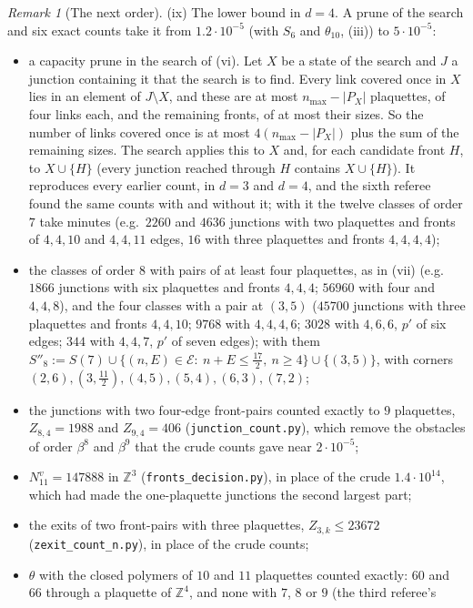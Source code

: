 \documentclass[11pt,a4paper]{article}
\theoremstyle{definition}
\theoremstyle{remark}
\newtheorem{remark}[theorem]{Remark}
\newcommand{\Z}{\mathbb{Z}}
\begin{document}
\begin{remark}[The next order]
(ix) The lower bound in $d=4$. A prune of the search and six exact counts take it from $1.2\cdot10^{-5}$ (with $S_6$ and $\theta_{10}$, (iii)) to $5\cdot10^{-5}$:
\begin{itemize}
\item a capacity prune in the search of (vi). Let $X$ be a state of the search and $J$ a junction containing it that the search is to find. Every link covered once in $X$ lies in an
element of $J\setminus X$, and these are at most $n_{\max}-|P_X|$ plaquettes, of four links each, and the remaining fronts, of at most their sizes. So the number of links covered once is at
most $4(n_{\max}-|P_X|)$ plus the sum of the remaining sizes. The search applies this to $X$ and, for each candidate front $H$, to $X\cup\{H\}$ (every junction reached through $H$
contains $X\cup\{H\}$). It reproduces every earlier count, in $d=3$ and $d=4$, and the sixth referee found the same counts with and without it; with it the twelve classes of order $7$ take minutes (e.g.\ $2260$ and $4636$ junctions with two
plaquettes and fronts of $4,4,10$ and $4,4,11$ edges, $16$ with three plaquettes and fronts $4,4,4,4$);
\item the classes of order $8$ with pairs of at least four plaquettes, as in (vii) (e.g.\ $1866$ junctions with six plaquettes and fronts $4,4,4$; $56960$ with four and
$4,4,8$), and the four classes with a pair at $(3,5)$ ($45700$ junctions with three plaquettes and fronts $4,4,10$; $9768$ with $4,4,4,6$; $3028$ with $4,6,6$, $p'$ of six edges;
$344$ with $4,4,7$, $p'$ of seven edges); with them $S''_8:=S(7)\cup\{(n,E)\in\mathcal E:\ n+E\le\frac{17}2,\ n\ge4\}\cup\{(3,5)\}$, with corners $(2,6),(3,\frac{11}2),(4,5),(5,4),(6,3),(7,2)$;
\item the junctions with two four-edge front-pairs counted exactly to $9$ plaquettes, $Z_{8,4}=1988$ and $Z_{9,4}=406$ (\texttt{junction\_count.py}), which remove the obstacles
of order $\beta^8$ and $\beta^9$ that the crude counts gave near $2\cdot10^{-5}$;
\item $N^v_{11}=147888$ in $\Z^3$ (\texttt{fronts\_decision.py}), in place of the crude $1.4\cdot10^{14}$, which had made the one-plaquette junctions the second largest part;
\item the exits of two front-pairs with three plaquettes, $Z_{3,k}\le23672$ (\texttt{zexit\_count\_n.py}), in place of the crude counts;
\item $\theta$ with the closed polymers of $10$ and $11$ plaquettes counted exactly: $60$ and $66$ through a plaquette of $\Z^4$, and none with $7$, $8$ or $9$ (the third referee's

\end{itemize}
\end{remark}
\end{document}
